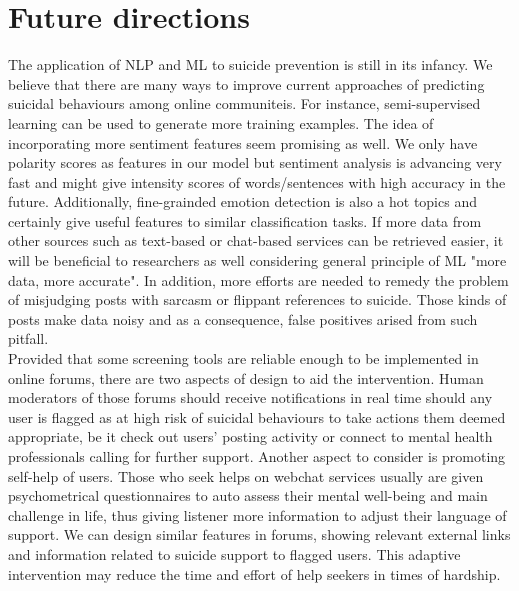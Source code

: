 \section{Future directions}
The application of NLP and ML to suicide prevention is still in its infancy. We believe that there are many ways to improve current approaches of predicting suicidal behaviours among online communiteis. For instance, semi-supervised learning can be used to generate more training examples. The idea of incorporating more sentiment features seem promising as well. We only have polarity scores as features in our model but sentiment analysis is advancing very fast and might give intensity scores of words/sentences with high accuracy in the future. Additionally, fine-grainded emotion detection is also a hot topics and certainly give useful features to similar classification tasks. If more data from other sources such as text-based or chat-based services can be retrieved easier, it will be beneficial to researchers as well considering general principle of ML "more data, more accurate". In addition, more efforts are needed to remedy the problem of misjudging posts with sarcasm or flippant references to suicide. Those kinds of posts make data noisy and as a consequence, false positives arised from such pitfall. \\
Provided that some screening tools are reliable enough to be implemented in online forums, there are two aspects of design to aid the intervention. Human moderators of those forums should receive notifications in real time should any user is flagged as at high risk of suicidal behaviours to take actions them deemed appropriate, be it check out users' posting activity or connect to mental health professionals calling for further support. Another aspect to consider is promoting self-help of users. Those who seek helps on webchat services usually are given psychometrical questionnaires to auto assess their mental well-being and main challenge in life, thus giving listener more information to adjust their language of support. We can design similar features in forums, showing relevant external links and information related to suicide support to flagged users. This adaptive intervention may reduce the time and effort of help seekers in times of hardship.




